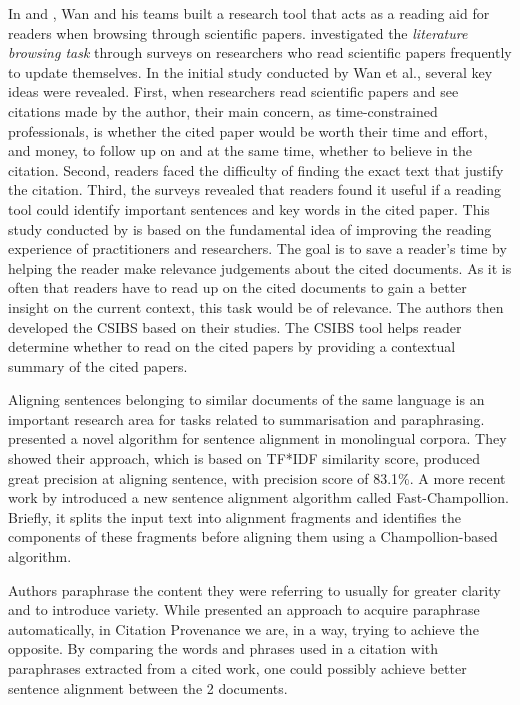 In \cite{citation-sensitive} and \cite{csibs}, Wan and his teams built a research tool that acts as a reading aid for readers when browsing through scientific papers.  investigated the \textit{literature browsing task} through surveys on researchers who read scientific papers frequently to update themselves. In the initial study conducted by Wan et al., several key ideas were revealed. First, when researchers read scientific papers and see citations made by the author, their main concern, as time-constrained professionals, is whether the cited paper would be worth their time and effort, and money, to follow up on and at the same time, whether to believe in the citation. Second, readers faced the difficulty of finding the exact text that justify the citation. Third, the surveys revealed that readers found it useful if a reading tool could identify important sentences and key words in the cited paper. This study conducted by  is based on the fundamental idea of improving the reading experience of practitioners and researchers. The goal is to save a reader's time by helping the reader make relevance judgements about the cited documents. As it is often that readers have to read up on the cited documents to gain a better insight on the current context, this task would be of relevance. The authors then developed the CSIBS based on their studies. The CSIBS tool helps reader determine whether to read on the cited papers by providing a contextual summary of the cited papers.

Aligning sentences belonging to similar documents of the same language is an important research area for tasks related to summarisation and paraphrasing.  presented a novel algorithm for sentence alignment in monolingual corpora. They showed their approach, which is based on TF*IDF similarity score, produced great precision at aligning sentence, with precision score of 83.1\%. A more recent work by  introduced a new sentence alignment algorithm called Fast-Champollion. Briefly, it splits the input text into alignment fragments and identifies the components of these fragments before aligning them using a Champollion-based algorithm.

Authors paraphrase the content they were referring to usually for greater clarity and to introduce variety. While  presented an approach to acquire paraphrase automatically, in Citation Provenance we are, in a way, trying to achieve the opposite. By comparing the words and phrases used in a citation with paraphrases extracted from a cited work, one could possibly achieve better sentence alignment between the 2 documents.
